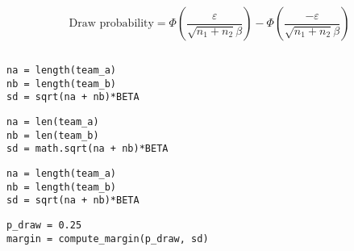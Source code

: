 \documentclass[article]{jss}
\newif\ifen
\newif\ifes
\newcommand{\en}[1]{\ifen#1\fi}
\newcommand{\es}[1]{\ifes#1\fi}
\begin{document}
%
\en{Since the observed results are independent of our beliefs, the only source of uncertainty comes from the variance of individual perfomances $\beta$.}
\es{Como los resultados observados son independientes de nuestras creencias, la \'unica fuente de incertidumbre proviene de varianza de los rendimientos $\beta$.}
%
\en{This is how we can define an equation that links the margin with the probability of a tie.}
\es{Así es que podemos definir una ecuaci\'on que vincula el margen con la probabilidades de empate.}
%
\begin{equation}
 \text{Draw probability} = \Phi(\frac{\varepsilon}{\sqrt{n_1+n_2}\beta}) - \Phi(\frac{-\varepsilon}{\sqrt{n_1+n_2}\beta})
\end{equation}
%
\begin{lstlisting}[backgroundcolor=\color
{white},label=lst:draw, caption=\relax, belowskip=-1.0 \baselineskip, aboveskip=-0 \baselineskip]
\end{lstlisting}
\begin{paracol}{3}
\begin{lstlisting}[backgroundcolor=\color{julia},belowskip=-0.77 \baselineskip]
na = length(team_a)
nb = length(team_b)
sd = sqrt(na + nb)*BETA
\end{lstlisting}
\switchcolumn
\begin{lstlisting}[backgroundcolor=\color{python},belowskip=-0.77 \baselineskip]
na = len(team_a)
nb = len(team_b)
sd = math.sqrt(na + nb)*BETA
\end{lstlisting}
\switchcolumn
\begin{lstlisting}[backgroundcolor=\color{r},belowskip=-0.77 \baselineskip]
na = length(team_a)
nb = length(team_b)
sd = sqrt(na + nb)*BETA
\end{lstlisting}
\end{paracol}
\begin{lstlisting}[backgroundcolor=\color{all}]
p_draw = 0.25
margin = compute_margin(p_draw, sd)
\end{lstlisting}  
%
%
\subsection{\en{Optimal approximation of the exact posterior}} \label{sec:approximate _posterior}
\end{document}
